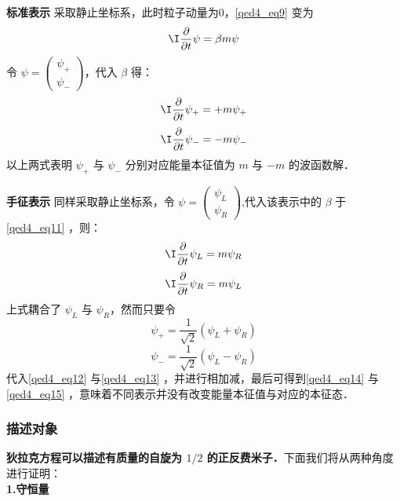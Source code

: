 \textbf{标准表示}
采取静止坐标系，此时粒子动量为0，\autoref{qed4_eq9} 变为
\begin{equation}\label{qed4_eq11}
 \I \frac{\partial}{\partial t} \psi= \beta m\psi
\end{equation}
令 $\psi=\left(\begin{array}{l}\psi_{+} \\ \psi_{-}\end{array}\right)$，代入 $\beta$ 得：
\begin{equation}\label{qed4_eq14}
 \I \frac{\partial}{\partial t} \psi_{+}=+m \psi_{+}
\end{equation}
\begin{equation}\label{qed4_eq15}
 \I \frac{\partial}{\partial t} \psi_{-}=-m \psi_{-}
\end{equation}
以上两式表明 $\psi_{+}$ 与 $\psi_{-}$ 分别对应能量本征值为 $m$ 与 $-m$ 的波函数解．

\textbf{手征表示} 同样采取静止坐标系，令 $\psi=\left(\begin{array}{l}\psi_{L} \\ \psi_{R}\end{array}\right)$,代入该表示中的 $\beta$ 于\autoref{qed4_eq11} ，则：
\begin{equation}\label{qed4_eq12}
 \I\frac{\partial}{\partial t} \psi_{L}=m \psi_{R}
\end{equation}
\begin{equation}\label{qed4_eq13}
 \I\frac{\partial}{\partial t} \psi_{R}=m \psi_{L}
\end{equation}
上式耦合了 $\psi_{L}$ 与 $\psi_{R}$，然而只要令
\begin{equation}
\psi_{+}=\frac{1}{\sqrt{2}}\left(\psi_{L}+\psi_{R}\right)
\end{equation}
\begin{equation}
\psi_{-}=\frac{1}{\sqrt{2}}\left(\psi_{L}-\psi_{R}\right)
\end{equation}
代入\autoref{qed4_eq12} 与\autoref{qed4_eq13} ，并进行相加减，最后可得到\autoref{qed4_eq14} 与\autoref{qed4_eq15} ，意味着不同表示并没有改变能量本征值与对应的本征态．



\subsubsection{描述对象}
\textbf{狄拉克方程可以描述有质量的自旋为 $1/2$ 的正反费米子．}下面我们将从两种角度进行证明：\\
\textbf{1.守恒量}

